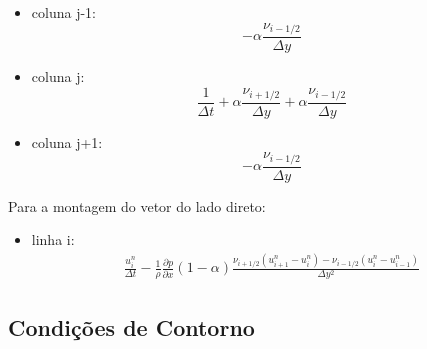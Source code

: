 \begin{itemize}
	\item{coluna j-1:}
		\begin{equation}
			-\alpha \frac{\nu_{i-1/2}}{\Delta y}
		\end{equation}
	\item{coluna j:}
		\begin{equation}
			\frac{1}{\Delta t} 
			+ \alpha \frac{\nu_{i+1/2}}{\Delta y}
			+ \alpha \frac{\nu_{i-1/2}}{\Delta y}
		\end{equation}
	\item{coluna j+1:}
		\begin{equation}
			-\alpha \frac{\nu_{i-1/2}}{\Delta y}
		\end{equation}
\end{itemize}

Para a montagem do vetor do lado direto:

\begin{itemize}
	\item{linha i:}
		\begin{eqnarray}
			\frac{u_i^{n}}{\Delta t} 
			-\frac{1}{\rho}\frac{\partial p}{\partial x} 
			(1-\alpha)\frac{\nu_{i+1/2}(u_{i+1}^n-u_{i}^n)
			-\nu_{i-1/2}(u_{i}^n-u_{i-1}^n)}{\Delta y^2}
			\label{eq:perfil_turbulento_discr}
		\end{eqnarray}
\end{itemize}

\subsection{Condições de Contorno}



